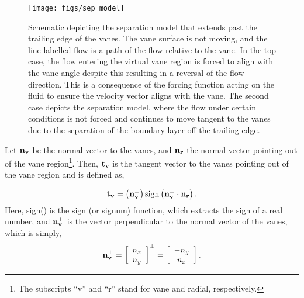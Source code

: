 \begin{figure}[!htb]
  \begin{center}
    \texttt{[image: figs/sep\_model]}
    \caption{Schematic depicting the separation model that extends past
   the trailing edge of the vanes. The vane surface is not moving, and 
   the line labelled flow is a path of the flow relative to the vane. 
   In the top case, the flow entering the virtual vane region is forced
   to align with the vane angle despite this resulting in a reversal of
   the flow direction. This is a consequence of the forcing function
   acting on the fluid to ensure the velocity vector aligns with the
   vane. The second case depicts the separation model, where the flow
   under certain conditions is not forced and continues to move tangent
   to the vanes due to the separation of the boundary layer off the
   trailing edge.}  
    \label{fig:sep_model}
  \end{center}
\end{figure}

Let $\bf n_v$ be the normal vector to the vanes,
and $\bf n_r$ the normal vector pointing out of the vane
region\footnote{\normalsize The subscripts ``v'' and ``r'' stand for
vane and radial, respectively.}.  
Then, $\bf t_v$ is the tangent vector to the vanes pointing out of
the vane region and is defined as,

\begin{equation}
 \bf t_v = \left( {\bf n_v^{\perp}} \right) \text{sign}\left(
	    {\bf n_v^{\perp}} \cdot {\bf n_r} \right).
\end{equation}
Here, sign() is the sign (or signum) function, which extracts the 
sign of a real number, and ${\bf n_v^{\perp}}$ is the vector 
perpendicular to the normal vector of the vanes, which is simply, 
\begin{equation*}
 {\bf n_v^{\perp}} = \left[ \begin{array}{c}
n_x\\
n_y\\
\end{array}\right]^{\perp} = 
 \left[ \begin{array}{c}
  -n_y\\
  n_x\\
	\end{array}\right].
\end{equation*}

